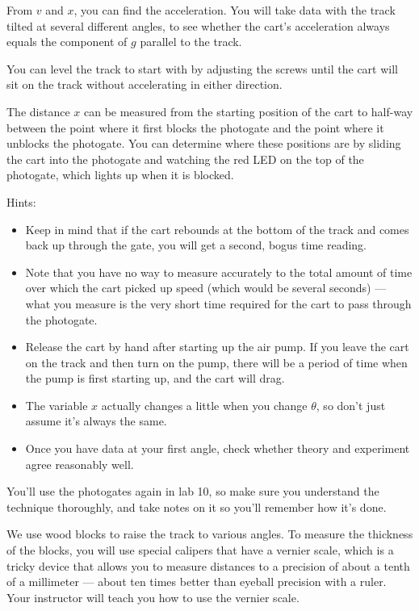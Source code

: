 From $v$ and $x$, you can find the
acceleration.  You will take data with the track tilted at
several different angles, to see whether the cart's
acceleration always equals the component of  $g$ parallel to the track.

You can level the track to start with by adjusting the
screws until the cart will sit on the track without
accelerating in either direction.

The distance $x$ can be measured from the starting position
of the cart to half-way between the point where it first
blocks the photogate and the point where it unblocks the
photogate.  You can determine where these positions are by
sliding the cart into the photogate and watching the red LED
on the top of the photogate, which lights up when it is blocked.

Hints:

\begin{itemize}
\item[] Keep in mind that if the cart rebounds at the bottom of
the track and comes back up through the gate, you will get a
second, bogus time reading.

\item[] Note that you have no way to measure accurately to the
total amount of time over which the cart picked up speed
(which would be several seconds) --- what you measure is the
very short time required for the cart to pass through the photogate.

\item[] Release the cart by hand after starting up the air pump.
If you leave the cart on the track and then turn on the pump, there
will be a period of time when the pump is first starting up, and
the cart will drag.

\item[] The variable $x$ actually changes a little when you change $\theta$,
so don't just assume it's always the same.

\item[] Once you have data at your first angle, check whether theory and experiment
agree reasonably well.
\end{itemize}

You'll use the photogates again in lab 10, so make sure you understand
the technique thoroughly, and take notes on it so you'll remember how it's
done.

We use wood blocks to raise the track to various angles. To measure the thickness
of the blocks, you will use special calipers that have a vernier
scale, which is a tricky device that allows you to measure distances
to a precision of about a tenth of a millimeter --- about ten times better than
eyeball precision with a ruler. Your instructor will teach you how to use
the vernier scale.

